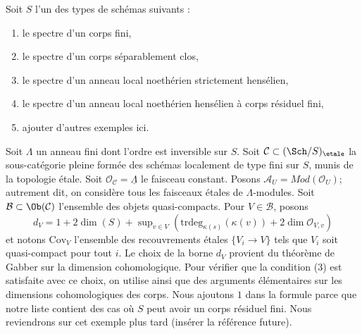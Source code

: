 \begin{example}
\label{example-etale}
Soit $S$ l'un des types de schémas suivants :
\begin{enumerate}
\item le spectre d'un corps fini,
\item le spectre d'un corps séparablement clos,
\item le spectre d'un anneau local noethérien strictement hensélien,
\item le spectre d'un anneau local noethérien hensélien
à corps résiduel fini,
\item ajouter d'autres exemples ici.
\end{enumerate}
Soit $\Lambda$ un anneau fini dont l'ordre est inversible sur $S$.
Soit $\mathcal{C} \subset (\Sch/S)_\etale$
la sous-catégorie pleine formée des schémas localement de type fini
sur $S$, munis de la topologie étale.
Soit $\mathcal{O}_\mathcal{C} = \underline{\Lambda}$ le
faisceau constant. Posons $\mathcal{A}_U = \textit{Mod}(\mathcal{O}_U)$;
autrement dit, on considère tous les faisceaux étales de $\Lambda$-modules.
Soit $\mathcal{B} \subset \Ob(\mathcal{C})$
l'ensemble des objets quasi-compacts. Pour $V \in \mathcal{B}$, posons
$$
d_V = 1 + 2\dim(S) +
\sup\nolimits_{v \in V}(\text{trdeg}_{\kappa(s)}(\kappa(v)) +
2 \dim \mathcal{O}_{V, v})
$$
et notons $\text{Cov}_V$ l'ensemble des recouvrements étales $\{V_i \to V\}$
tels que $V_i$ soit quasi-compact pour tout $i$.
Le choix de la borne $d_V$ provient du théorème de Gabber
sur la dimension cohomologique. Pour vérifier que la condition (3)
est satisfaite avec ce choix, on utilise
\cite[Exposé VIII-A, corollaire 1.2 et lemme 2.2]{Traveaux}
ainsi que des arguments élémentaires sur les dimensions cohomologiques des corps.
Nous ajoutons $1$ dans la formule parce que notre liste contient des cas où $S$
peut avoir un corps résiduel fini.
Nous reviendrons sur cet exemple plus tard (insérer la référence future).
\end{example}

